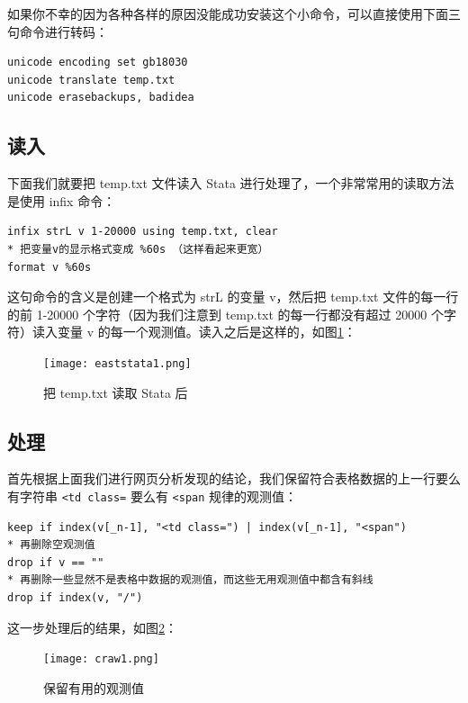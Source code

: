 \documentclass[cn,fancy,blue,11pt]{elegantbook}
\begin{document}
如果你不幸的因为各种各样的原因没能成功安装这个小命令，可以直接使用下面三句命令进行转码：

\begin{lstlisting}
unicode encoding set gb18030
unicode translate temp.txt
unicode erasebackups, badidea
\end{lstlisting}

\hypertarget{section-34}{%
\subsection{读入}\label{section-34}}

下面我们就要把 temp.txt 文件读入 Stata 进行处理了，一个非常常用的读取方法是使用 infix 命令：

\begin{lstlisting}
infix strL v 1-20000 using temp.txt, clear
* 把变量v的显示格式变成 %60s （这样看起来更宽）
format v %60s
\end{lstlisting}

这句命令的含义是创建一个格式为 strL 的变量 v，然后把 temp.txt 文件的每一行的前 1-20000 个字符（因为我们注意到 temp.txt 的每一行都没有超过 20000 个字符）读入变量 v 的每一个观测值。读入之后是这样的，如图\ref{fig:eaststata1}：

\begin{figure}
  \centering
  \texttt{[image: eaststata1.png]}
  \caption{把 temp.txt 读取 Stata 后}
  \label{fig:eaststata1}
\end{figure}

\hypertarget{section-35}{%
\subsection{处理}\label{section-35}}

首先根据上面我们进行网页分析发现的结论，我们保留符合表格数据的上一行要么有字符串 \lstinline{<td class=} 要么有 \lstinline{<span} 规律的观测值：

\begin{lstlisting}
keep if index(v[_n-1], "<td class=") | index(v[_n-1], "<span")
* 再删除空观测值
drop if v == ""
* 再删除一些显然不是表格中数据的观测值，而这些无用观测值中都含有斜线
drop if index(v, "/")
\end{lstlisting}

这一步处理后的结果，如图\ref{fig:craw1}：

\begin{figure}
  \centering
  \texttt{[image: craw1.png]}
  \caption{保留有用的观测值}
  \label{fig:craw1}
\end{figure}
\end{document}

